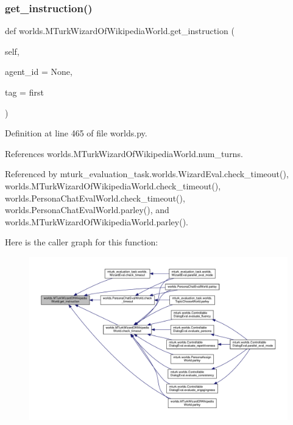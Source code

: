 \subsubsection{\texorpdfstring{get\+\_\+instruction()}{get\_instruction()}}
{\footnotesize\ttfamily def worlds.\+M\+Turk\+Wizard\+Of\+Wikipedia\+World.\+get\+\_\+instruction (\begin{DoxyParamCaption}\item[{}]{self,  }\item[{}]{agent\+\_\+id = {\ttfamily None},  }\item[{}]{tag = {\ttfamily \textquotesingle{}first\textquotesingle{}} }\end{DoxyParamCaption})}



Definition at line 465 of file worlds.\+py.



References worlds.\+M\+Turk\+Wizard\+Of\+Wikipedia\+World.\+num\+\_\+turns.



Referenced by mturk\+\_\+evaluation\+\_\+task.\+worlds.\+Wizard\+Eval.\+check\+\_\+timeout(), worlds.\+M\+Turk\+Wizard\+Of\+Wikipedia\+World.\+check\+\_\+timeout(), worlds.\+Persona\+Chat\+Eval\+World.\+check\+\_\+timeout(), worlds.\+Persona\+Chat\+Eval\+World.\+parley(), and worlds.\+M\+Turk\+Wizard\+Of\+Wikipedia\+World.\+parley().

Here is the caller graph for this function\+:
\nopagebreak
\begin{figure}[H]
\begin{center}
\leavevmode
\includegraphics[width=350pt]{classworlds_1_1MTurkWizardOfWikipediaWorld_a99b976d4f864256d99873f88933632c0_icgraph}
\end{center}
\end{figure}
\mbox{\label{classworlds_1_1MTurkWizardOfWikipediaWorld_ad49b2e40a83896f6d0e67928f661d1c1}} 
